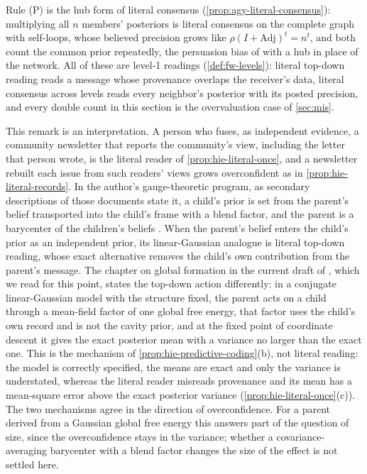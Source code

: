 \begin{remark}\label{rem:hie-literal-consensus}
Rule (P) is the hub form of literal consensus (\cref{prop:agy-literal-consensus}): multiplying all $n$ members' posteriors is literal consensus on the complete graph with self-loops, whose believed precision grows like $\rho(I+\mathrm{Adj})^t=n^t$, and both count the common prior repeatedly, the persuasion bias of \citet{demarzo2003persuasion} with a hub in place of the network. All of these are level-1 readings (\cref{def:fw-levels}): literal top-down reading reads a message whose provenance overlaps the receiver's data, literal consensus across levels reads every neighbor's posterior with its posted precision, and every double count in this section is the overvaluation case of \cref{sec:mis}.
\end{remark}

\begin{remark}\label{rem:hie-gauge}
This remark is an interpretation. A person who fuses, as independent evidence, a community newsletter that reports the community's view, including the letter that person wrote, is the literal reader of \cref{prop:hie-literal-once}, and a newsletter rebuilt each issue from such readers' views grows overconfident as in \cref{prop:hie-literal-records}. In the author's gauge-theoretic program, as secondary descriptions of those documents state it, a child's prior is set from the parent's belief transported into the child's frame with a blend factor, and the parent is a barycenter of the children's beliefs \citep{dennis2026magent,dennis2026formation}. When the parent's belief enters the child's prior as an independent prior, its linear-Gaussian analogue is literal top-down reading, whose exact alternative removes the child's own contribution from the parent's message. The chapter on global formation in the current draft of \citet{dennis2026magent}, which we read for this point, states the top-down action differently: in a conjugate linear-Gaussian model with the structure fixed, the parent acts on a child through a mean-field factor of one global free energy, that factor uses the child's own record and is not the cavity prior, and at the fixed point of coordinate descent it gives the exact posterior mean with a variance no larger than the exact one. This is the mechanism of \cref{prop:hie-predictive-coding}(b), not literal reading: the model is correctly specified, the means are exact and only the variance is understated, whereas the literal reader misreads provenance and its mean has a mean-square error above the exact posterior variance (\cref{prop:hie-literal-once}(c)). The two mechanisms agree in the direction of overconfidence. For a parent derived from a Gaussian global free energy this answers part of the question of size, since the overconfidence stays in the variance; whether a covariance-averaging barycenter with a blend factor changes the size of the effect is not settled here.
\end{remark}


